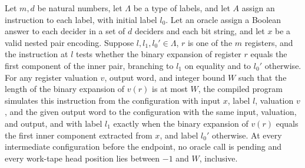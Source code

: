 \begin{lemma}
\label{Complexity.LogProg.sim_jeqFst}
\leanok
{}
Let $m,d$ be natural numbers, let $\Lambda$ be a type of labels, and let $A$ assign an
instruction to each label, with initial label $l_0$. Let an oracle assign a Boolean
answer to each decider in a set of $d$ deciders and each bit string, and let $x$ be a
valid nested pair encoding. Suppose $l,l_1,l_0'\in\Lambda$, $r$ is one of the $m$
registers, and the instruction at $l$ tests whether the binary expansion of register $r$
equals the first component of the inner pair, branching to $l_1$ on equality and to
$l_0'$ otherwise. For any register valuation $v$, output word, and integer bound $W$
such that the length of the binary expansion of $v(r)$ is at most $W$, the compiled
program simulates this instruction from the configuration with input $x$, label $l$,
valuation $v$, and the given output word to the configuration with the same input,
valuation, and output, and with label $l_1$ exactly when the binary expansion of $v(r)$
equals the first inner component extracted from $x$, and label $l_0'$ otherwise. At
every intermediate configuration before the endpoint, no oracle call is pending and
every work-tape head position lies between $-1$ and $W$, inclusive.
\end{lemma}

